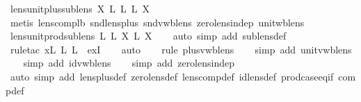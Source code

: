 \begin{isabellebody}
\endisatagproof
{\isafoldproof}%
%
\isadelimproof
\isanewline
%
\endisadelimproof
\isanewline
{}\isamarkupfalse%
\ lens{\isacharunderscore}unit{\isacharunderscore}plus{\isacharunderscore}sublens{\isacharunderscore}{}{\isacharcolon}\ {\isachardoublequoteopen}X\ {\isasymsubseteq}\isactrlsub L\ {}\isactrlsub L\ {\isacharplus}\isactrlsub L\ X{\isachardoublequoteclose}\isanewline
%
\isadelimproof
\ \ %
\endisadelimproof
%
\isatagproof
{}\isamarkupfalse%
\ {\isacharparenleft}metis\ lens{\isacharunderscore}comp{\isacharunderscore}lb\ snd{\isacharunderscore}lens{\isacharunderscore}plus\ snd{\isacharunderscore}vwb{\isacharunderscore}lens\ zero{\isacharunderscore}lens{\isacharunderscore}indep\ unit{\isacharunderscore}wb{\isacharunderscore}lens{\isacharparenright}%
\endisatagproof
{\isafoldproof}%
%
\isadelimproof
\isanewline
%
\endisadelimproof
\isanewline
{}\isamarkupfalse%
\ lens{\isacharunderscore}unit{\isacharunderscore}prod{\isacharunderscore}sublens{\isacharunderscore}{}{\isacharcolon}\ {\isachardoublequoteopen}{}\isactrlsub L\ {\isacharplus}\isactrlsub L\ X\ {\isasymsubseteq}\isactrlsub L\ X{\isachardoublequoteclose}\isanewline
%
\isadelimproof
\ \ %
\endisadelimproof
%
\isatagproof
{}\isamarkupfalse%
\ {\isacharparenleft}auto\ simp\ add{\isacharcolon}\ sublens{\isacharunderscore}def{\isacharparenright}\isanewline
\ \ \isamarkupfalse%
\ {\isacharparenleft}rule{\isacharunderscore}tac\ x{\isacharequal}{\isachardoublequoteopen}{}\isactrlsub L\ {\isacharplus}\isactrlsub L\ {}\isactrlsub L{\isachardoublequoteclose}\ \ exI{\isacharparenright}\isanewline
\ \ \isamarkupfalse%
\ {\isacharparenleft}auto{\isacharparenright}\isanewline
\ \ \isamarkupfalse%
\ {\isacharparenleft}rule\ plus{\isacharunderscore}vwb{\isacharunderscore}lens{\isacharparenright}\isanewline
\ \ \isamarkupfalse%
\ {\isacharparenleft}simp\ add{\isacharcolon}\ unit{\isacharunderscore}vwb{\isacharunderscore}lens{\isacharparenright}\isanewline
\ \ \isamarkupfalse%
\ {\isacharparenleft}simp\ add{\isacharcolon}\ id{\isacharunderscore}vwb{\isacharunderscore}lens{\isacharparenright}\isanewline
\ \ \isamarkupfalse%
\ {\isacharparenleft}simp\ add{\isacharcolon}\ zero{\isacharunderscore}lens{\isacharunderscore}indep{\isacharparenright}\isanewline
\ \ \isamarkupfalse%
\ {\isacharparenleft}auto\ simp\ add{\isacharcolon}\ lens{\isacharunderscore}plus{\isacharunderscore}def\ zero{\isacharunderscore}lens{\isacharunderscore}def\ lens{\isacharunderscore}comp{\isacharunderscore}def\ id{\isacharunderscore}lens{\isacharunderscore}def\ prod{\isachardot}case{\isacharunderscore}eq{\isacharunderscore}if\ comp{\isacharunderscore}def{\isacharparenright}\isanewline

\end{isabellebody}
